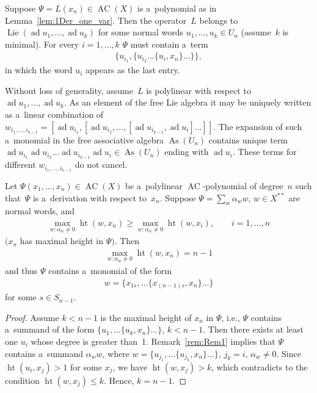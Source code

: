 \documentclass[pdftex]{sigma}
\DeclareMathOperator{\ad}{ad}
\begin{document}
\begin{remark}
\label{rem:Rem1}
Suppose $\Psi=L(x_n)\in \operatorname{AC}(X) $ is a~polynomial as in Lemma~\ref{lem:1Der_one_var}.
Then the operator~$L$ belongs to $\operatorname{Lie}(\ad u_1,\dots, \ad u_k)$ for some normal words $u_1,\dots, u_k
\in U_n$ (assume~$k$ is minimal).
For every $i=1,\dots, k$ $\Psi $ must contain a~term
\begin{gather*}
\{u_{i_1},\{u_{i_2} \dots\{u_{i},x_n\}\dots \}\},
\end{gather*}
in which the word $u_i$ appears as the last entry.
\end{remark}

Without loss of generality, assume~$L$ is polylinear with respect to $\ad u_1, \dots, \ad u_k$.
As an element of the free Lie algebra it may be uniquely written as a~linear combination of $w_{i_1,\dots, i_{k-1}} =
[\ad u_{i_1}, [\ad u_{i_2}, \dots, [\ad u_{i_{k-1}}, \ad u_i]\dots]]$.
The expansion of such a~monomial in the free associative algebra $\operatorname{As}(U_n)$ contains unique term $\ad u_{i_1}
\ad u_{i_2} \dots \ad u_{i_{k-1}} \ad u_i\in \operatorname{As}(U_n)$ ending with $\ad u_i$.
These terms for dif\/ferent $w_{i_1,\dots, i_{k-1}}$ do not cancel.

\begin{corollary}
\label{cor:ACformDer}
Let $\Psi(x_1,\dots, x_n) \in \operatorname{AC}(X)$ be a~polylinear $\operatorname{AC}$-poly\-no\-mi\-al of degree~$n$ such that~$\Psi $ is a~derivation
with respect to~$x_n$.
Suppose $\Psi = \sum\limits_{w} \alpha_w w$, $w\in X^{**}$ are normal words, and
\begin{gather*}
\max\limits_{w:\alpha_w\ne 0} \operatorname{ht}(w,x_n)\ge \max\limits_{w:\alpha_w\ne 0} \operatorname{ht}(w,x_i),
\qquad
i=1,\dots, n
\end{gather*}
$(x_n$ has maximal height in $\Psi)$.
Then
\begin{gather*}
\max\limits_{w:\alpha_w\ne 0} \operatorname{ht}(w,x_n) = n-1
\end{gather*}
and thus $\Psi $ contains a~monomial of the form
\begin{gather*}
w = \{x_{1s}, \dots \{x_{(n-1)s}, x_n\}\dots \}
\end{gather*}
for some $s\in S_{n-1}$.
\end{corollary}

\begin{proof}
Assume $k<n-1$ is the maximal height of $x_n$ in $\Psi $, i.e., $\Psi $ contains a~summand of the form $\{u_{1}, \dots
\{u_{k},x_n\}\dots \}$, $k<n-1$.
Then there exists at least one $u_i$ whose degree is greater than~1.
Remark~\ref{rem:Rem1} implies that $\Psi $ contains a~summand $\alpha_w w$, where $w = \{u_{j_1},\dots\{u_{j_k},x_n\}\dots \}$, $j_k=i$,
$\alpha_w\ne 0$.
Since $\operatorname{ht}(u_i,x_j)>1$ for some $x_j$, we have $\operatorname{ht}(w,x_j)>k$, which contradicts to the condition $\operatorname{ht}(w,x_j)\le k$.
Hence, $k=n-1$.
\end{proof}
\end{document}
